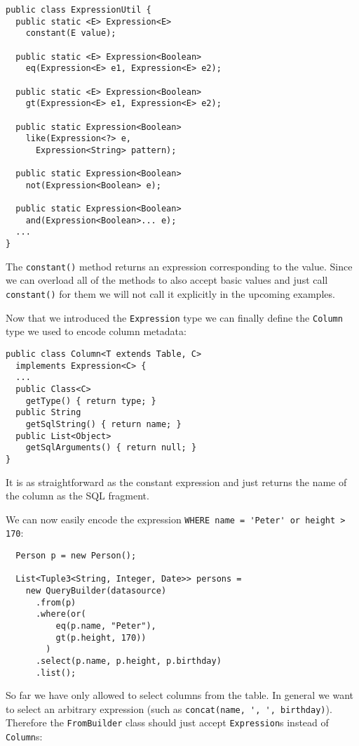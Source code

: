 \documentclass{sig-alternate}
\begin{document}
\begin{verbatim}
public class ExpressionUtil {
  public static <E> Expression<E> 
    constant(E value);

  public static <E> Expression<Boolean> 
    eq(Expression<E> e1, Expression<E> e2);

  public static <E> Expression<Boolean> 
    gt(Expression<E> e1, Expression<E> e2);

  public static Expression<Boolean> 
    like(Expression<?> e,
      Expression<String> pattern);

  public static Expression<Boolean> 
    not(Expression<Boolean> e);

  public static Expression<Boolean> 
    and(Expression<Boolean>... e);
  ...
}
\end{verbatim}

The \verb!constant()! method returns an expression corresponding to the value. Since we can overload all of the methods to also accept basic values and just call \verb!constant()! for them we will not call it explicitly in the upcoming examples.

Now that we introduced the \verb!Expression! type we can finally define the \verb!Column! type we used to encode column metadata:

\begin{verbatim}
public class Column<T extends Table, C> 
  implements Expression<C> {
  ...
  public Class<C> 
    getType() { return type; }
  public String 
    getSqlString() { return name; }
  public List<Object> 
    getSqlArguments() { return null; }		
}
\end{verbatim}

It is as straightforward as the constant expression and just returns the name of the column as the SQL fragment.

We can now easily encode the expression \verb!WHERE name = 'Peter' or height > 170!:

\begin{verbatim}
  Person p = new Person();
		
  List<Tuple3<String, Integer, Date>> persons =
    new QueryBuilder(datasource)
      .from(p)
      .where(or(
          eq(p.name, "Peter"),
          gt(p.height, 170))
        )
      .select(p.name, p.height, p.birthday)
      .list();
\end{verbatim}


So far we have only allowed to select columns from the table. In general we want to select an arbitrary expression (such as \verb!concat(name, ', ', birthday)!). Therefore the \verb!FromBuilder! class should just accept \verb!Expression!s instead of \verb!Column!s:
\end{document}

